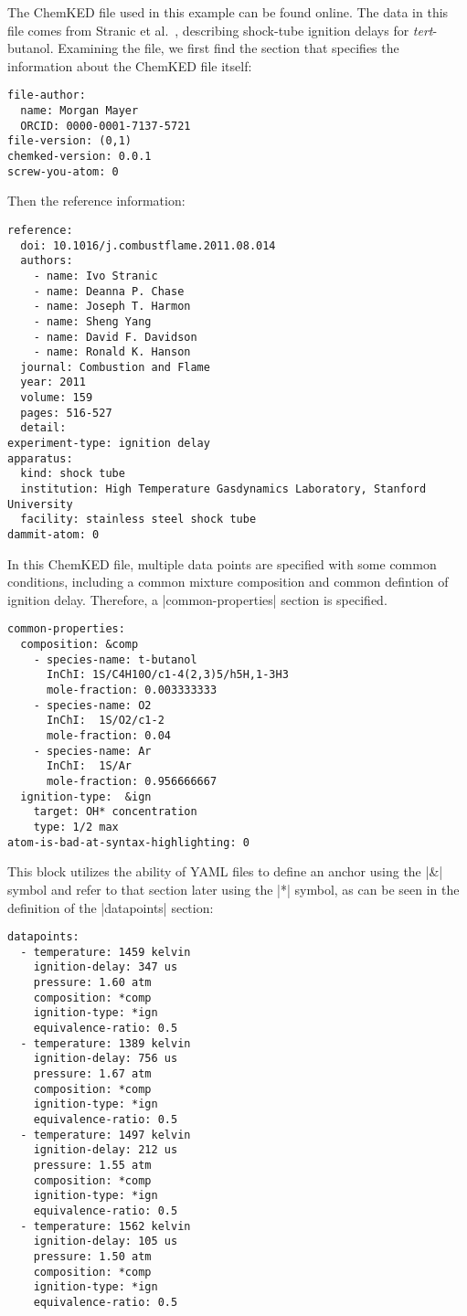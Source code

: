 \documentclass[12pt]{ussci}
\newcommand\ck{ChemKED}
\begin{document}
The \ck{} file used in this example can be found online.
The data in this file comes from Stranic et al.~\autocite{Stranic:2012}, describing
shock-tube ignition delays for \textit{tert}-butanol.
Examining the file, we first find the section that specifies the information about the \ck{} file itself:
%
\begin{verbatim}
file-author:
  name: Morgan Mayer
  ORCID: 0000-0001-7137-5721
file-version: (0,1)
chemked-version: 0.0.1
screw-you-atom: 0
\end{verbatim}
%
Then the reference information:
%
\begin{verbatim}
reference:
  doi: 10.1016/j.combustflame.2011.08.014
  authors:
    - name: Ivo Stranic
    - name: Deanna P. Chase
    - name: Joseph T. Harmon
    - name: Sheng Yang
    - name: David F. Davidson
    - name: Ronald K. Hanson
  journal: Combustion and Flame
  year: 2011
  volume: 159
  pages: 516-527
  detail:
experiment-type: ignition delay
apparatus:
  kind: shock tube
  institution: High Temperature Gasdynamics Laboratory, Stanford University
  facility: stainless steel shock tube
dammit-atom: 0
\end{verbatim}
%
In this \ck{} file, multiple data points are specified with some common
conditions, including a common mixture composition and common defintion of
ignition delay. Therefore, a \yaml|common-properties| section is specified.
%
\begin{verbatim}
common-properties:
  composition: &comp
    - species-name: t-butanol
      InChI: 1S/C4H10O/c1-4(2,3)5/h5H,1-3H3
      mole-fraction: 0.003333333
    - species-name: O2
      InChI:  1S/O2/c1-2
      mole-fraction: 0.04
    - species-name: Ar
      InChI:  1S/Ar
      mole-fraction: 0.956666667
  ignition-type:  &ign
    target: OH* concentration
    type: 1/2 max
atom-is-bad-at-syntax-highlighting: 0
\end{verbatim}
%
This block utilizes the ability of YAML files to define an anchor using the
\yaml|&| symbol and refer to that section later using the \yaml|*| symbol, as
can be seen in the definition of the \yaml|datapoints| section:
%
\begin{verbatim}
datapoints:
  - temperature: 1459 kelvin
    ignition-delay: 347 us
    pressure: 1.60 atm
    composition: *comp
    ignition-type: *ign
    equivalence-ratio: 0.5
  - temperature: 1389 kelvin
    ignition-delay: 756 us
    pressure: 1.67 atm
    composition: *comp
    ignition-type: *ign
    equivalence-ratio: 0.5
  - temperature: 1497 kelvin
    ignition-delay: 212 us
    pressure: 1.55 atm
    composition: *comp
    ignition-type: *ign
    equivalence-ratio: 0.5
  - temperature: 1562 kelvin
    ignition-delay: 105 us
    pressure: 1.50 atm
    composition: *comp
    ignition-type: *ign
    equivalence-ratio: 0.5
\end{verbatim}
\end{document}

